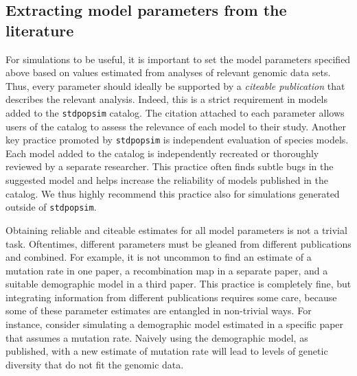 \documentclass[hidelinks]{article}
\newcommand{\stdpopsim}{\texttt{stdpopsim}\xspace}
\begin{document}
\subsection*{Extracting model parameters from the literature}
%
%
For simulations to be useful, it is important to set the model parameters
specified above based on values estimated from analyses of relevant genomic data sets.
Thus, every parameter should ideally be supported by a \emph{citeable publication} that
describes the relevant analysis.
Indeed, this is a strict requirement in models added to the \stdpopsim catalog.
The citation attached to each parameter allows users of the catalog to
assess the relevance of each model to their study. Another key practice promoted by \stdpopsim
is independent evaluation of species models.
Each model added to the catalog is independently recreated or thoroughly reviewed by a separate researcher.
This practice often finds subtle bugs in the suggested model and helps increase
the reliability of models published in the catalog.
We thus highly recommend this practice also for simulations generated outside of \stdpopsim.



Obtaining reliable and citeable estimates for all model parameters is not a trivial task.
Oftentimes, different parameters must be gleaned from different publications and combined.
For example, it is not uncommon to find an estimate of a mutation rate in one paper,
a recombination map in a separate paper, and a suitable demographic model in a third paper.
This practice is completely fine, but integrating information from different publications requires some care,
because some of these parameter estimates are entangled in non-trivial ways.
For instance, consider simulating a demographic model estimated in a specific paper that assumes
a mutation rate. Naively using the demographic model, as published, with a new estimate of mutation rate
will lead to levels of genetic diversity that do not fit the genomic data.
%

\end{document}
